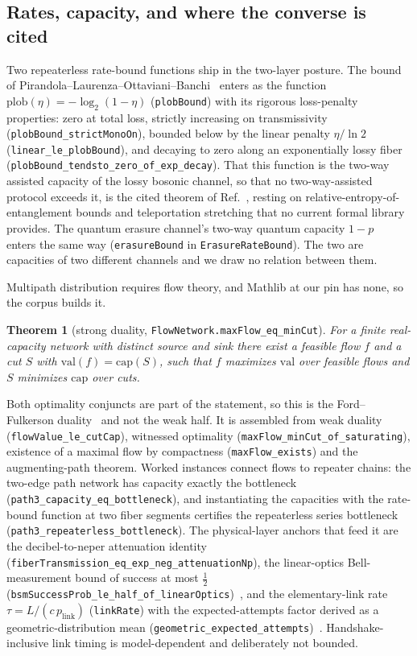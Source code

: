 \documentclass[aps,pra,reprint,nofootinbib,superscriptaddress]{revtex4-2}
\theoremstyle{plain}
\newtheorem{theorem}{Theorem}
\theoremstyle{definition}
\theoremstyle{remark}
\newcommand{\lean}[1]{\texttt{#1}}
\begin{document}
\subsection{Rates, capacity, and where the converse is cited}
\label{sec:capacity}

Two repeaterless rate-bound functions ship in the two-layer posture. The
bound of Pirandola--Laurenza--Ottaviani--Banchi~\cite{PLOB2017} enters as
the function $\mathrm{plob}(\eta) = -\log_2(1-\eta)$ (\lean{plobBound})
with its rigorous loss-penalty properties: zero at total loss, strictly
increasing on transmissivity (\lean{plobBound\_strictMonoOn}), bounded
below by the linear penalty $\eta/\ln 2$
(\lean{linear\_le\_plobBound}), and decaying to zero along an
exponentially lossy fiber
(\lean{plobBound\_tendsto\_zero\_of\_exp\_decay}). That this function is
the two-way assisted capacity of the lossy bosonic channel, so that no
two-way-assisted protocol exceeds it, is the cited theorem of
Ref.~\cite{PLOB2017}, resting on relative-entropy-of-entanglement bounds
and teleportation stretching that no current formal library provides. The
quantum erasure channel's two-way quantum capacity
$1-p$~\cite{BennettDiVincenzoSmolin1997} enters the same way
(\lean{erasureBound} in \lean{ErasureRateBound}). The two are capacities of two different channels
and we draw no relation between them.

Multipath distribution requires flow theory, and Mathlib at our pin has
none, so the corpus builds it.

\begin{theorem}[strong duality, \lean{FlowNetwork.maxFlow\_eq\_minCut}]
\label{thm:maxflow}
For a finite real-capacity network with distinct source and sink there
exist a feasible flow $f$ and a cut $S$ with
$\mathrm{val}(f) = \mathrm{cap}(S)$, such that $f$ maximizes
$\mathrm{val}$ over feasible flows and $S$ minimizes $\mathrm{cap}$ over
cuts.
\end{theorem}

Both optimality conjuncts are part of the statement, so this is the
Ford--Fulkerson duality~\cite{FordFulkerson1956} and not the weak half.
It is assembled from weak duality (\lean{flowValue\_le\_cutCap}),
witnessed optimality (\lean{maxFlow\_minCut\_of\_saturating}), existence
of a maximal flow by compactness (\lean{maxFlow\_exists}) and the
augmenting-path theorem. Worked instances connect flows to repeater
chains: the two-edge path network has capacity exactly the bottleneck
(\lean{path3\_capacity\_eq\_bottleneck}), and instantiating the
capacities with the rate-bound function at two fiber segments certifies
the repeaterless series bottleneck
(\lean{path3\_repeaterless\_bottleneck}). The physical-layer anchors that
feed it are the decibel-to-neper attenuation identity
(\lean{fiberTransmission\_eq\_exp\_neg\_attenuationNp}), the
linear-optics Bell-measurement bound of success at most $\tfrac12$
(\lean{bsmSuccessProb\_le\_half\_of\_linearOptics})~\cite{CalsamigliaLutkenhaus2001},
and the elementary-link rate $\tau = L/(c\,p_{\mathrm{link}})$
(\lean{linkRate}) with the expected-attempts factor derived as a
geometric-distribution mean
(\lean{geometric\_expected\_attempts})~\cite{Sangouard2011}.
Handshake-inclusive link timing is model-dependent and deliberately not
bounded.
\end{document}
